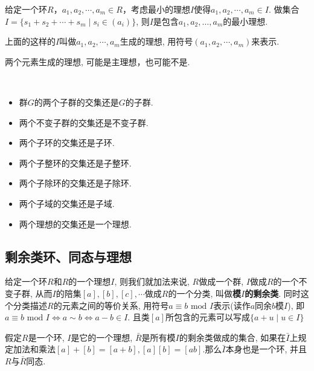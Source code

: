 \begin{Proposition}
给定一个环$R$，$a_1, a_2, \cdots, a_m \in R$，考虑最小的理想$I$使得$a_1, a_2, \cdots, a_m \in I$.
做集合$I = \{ s_1 + s_2 + \cdots + s_m \mid s_i \in (a_i) \}$, 
则$I$是包含$a_1, a_2, \dots, a_m$的最小理想.
\end{Proposition}

\begin{Definition}
上面的这样的$I$叫做$a_1, a_2, \cdots, a_m$生成的理想, 用符号$(a_1, a_2, \cdots, a_m)$来表示.
\end{Definition}

\begin{Note}
两个元素生成的理想, 可能是主理想，也可能不是.
\end{Note}

\begin{Proposition} \ \\
\begin{itemize}
\item 群$G$的两个子群的交集还是$G$的子群.
\item 两个不变子群的交集还是不变子群.
\item 两个子环的交集还是子环.
\item 两个子整环的交集还是子整环.
\item 两个子除环的交集还是子除环.
\item 两个子域的交集还是子域.
\item 两个理想的交集还是一个理想.
\end{itemize}
\end{Proposition}

\subsection{剩余类环、同态与理想} %

\begin{Note}
给定一个环$R$和$R$的一个理想$I$, 则我们就加法来说, $R$做成一个群, $I$做成$R$的一个不变子群, 从而$I$的陪集$[a], [b], [c], \cdots$做成$R$的一个分类, 叫做\textbf{模$I$的剩余类}. 同时这个分类描述$R$的元素之间的等价关系, 用符号$a \equiv b \text{ mod } I$表示(读作$a$同余$b$模$I$), 即$a \equiv b \text{ mod } I \Leftrightarrow a \sim b \Leftrightarrow a - b \in I$. 且类$[a]$所包含的元素可以写成$\{ a + u \mid u \in I \}$
\end{Note}

\begin{Theorem}
假定$R$是一个环, $I$是它的一个理想, $\bar{R}$是所有模$I$的剩余类做成的集合, 如果在$\bar{I}$上规定加法和乘法$[a] + [b] = [a + b], [a][b] = [ab]$.那么$\bar{I}$本身也是一个环, 并且$R$与$\bar{R}$同态.
\end{Theorem}

